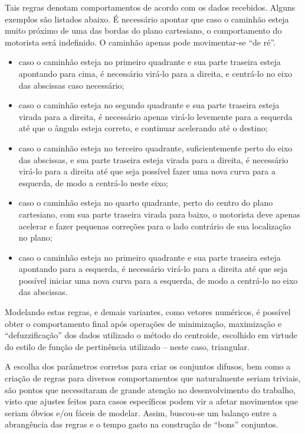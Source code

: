 \documentclass{article}
\begin{document}
Tais regras denotam comportamentos de acordo com os dados recebidos. Alguns
exemplos são listados abaixo. É necessário apontar que caso o caminhão esteja
muito próximo de uma das bordas do plano cartesiano, o comportamento do
motorista será indefinido. O caminhão apenas pode movimentar-se ``de ré''.

\begin{itemize}

    \item caso o caminhão esteja no primeiro quadrante e sua parte traseira
        esteja apontando para cima, é necessário virá-lo para a direita, e
        centrá-lo no eixo das abscissas caso necessário;

    \item caso o caminhão esteja no segundo quadrante e sua parte traseira
        esteja virada para a direita, é necessário apenas virá-lo levemente
        para a esquerda até que o ângulo esteja correto, e continuar
        acelerando até o destino;

    \item caso o caminhão esteja no terceiro quadrante, suficientemente perto
        do eixo das abscissas, e sua parte traseira esteja virada para a
        direita, é necessário virá-lo para a direita até que seja possível
        fazer uma nova curva para a esquerda, de modo a centrá-lo neste eixo;

    \item caso o caminhão esteja no quarto quadrante, perto do centro do plano
        cartesiano, com sua parte traseira virada para baixo, o motorista
        deve apenas acelerar e fazer pequenas correções para o lado contrário
        de sua localização no plano;

    \item caso o caminhão esteja no primeiro quadrante e sua parte traseira
        esteja apontando para a esquerda, é necessário virá-lo para a direita
        até que seja possível iniciar uma nova curva para a esquerda, de
        modo a centrá-lo no eixo das abscissas.

\end{itemize}

Modelando estas regras, e demais variantes, como vetores numéricos, é possível
obter o comportamento final após operações de minimização, maximização e
``defuzzificação'' dos dados utilizado o método do centroide, escolhido em
virtude do estilo de função de pertinência utilizado -- neste caso, triangular.

A escolha dos parâmetros corretos para criar os conjuntos difusos, bem como
a criação de regras para diversos comportamentos que naturalmente seriam
triviais, são pontos que necessitaram de grande atenção no desenvolvimento do
trabalho, visto que ajustes feitos para casos específicos podem vir a afetar
movimentos que seriam óbvios e/ou fáceis de modelar. Assim, buscou-se um
balanço entre a abrangência das regras e o tempo gasto na construção de
``bons'' conjuntos. \\
\end{document}
